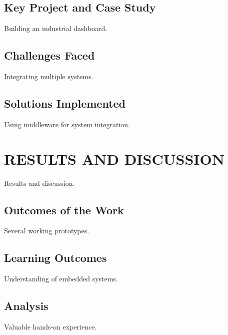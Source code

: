 \documentclass[12pt,a4paper]{report}
\begin{document}
\section{Key Project and Case Study}

Building an industrial dashboard.




\section{Challenges Faced}

Integrating multiple systems.


\section{Solutions Implemented}

Using middleware for system integration.


\chapter{RESULTS AND DISCUSSION}
\label{ch:results}


Results and discussion.




\section{Outcomes of the Work}

Several working prototypes.


\section{Learning Outcomes}

Understanding of embedded systems.


\section{Analysis}

Valuable hands-on experience.




\end{document}
